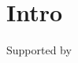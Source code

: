 \documentclass{aastex}
\begin{document}
\section{Intro}
Supported by 
\begin{plate}\caption{First.}\end{plate}
\begin{plate}\caption{Second.}\end{plate}
\end{document}
